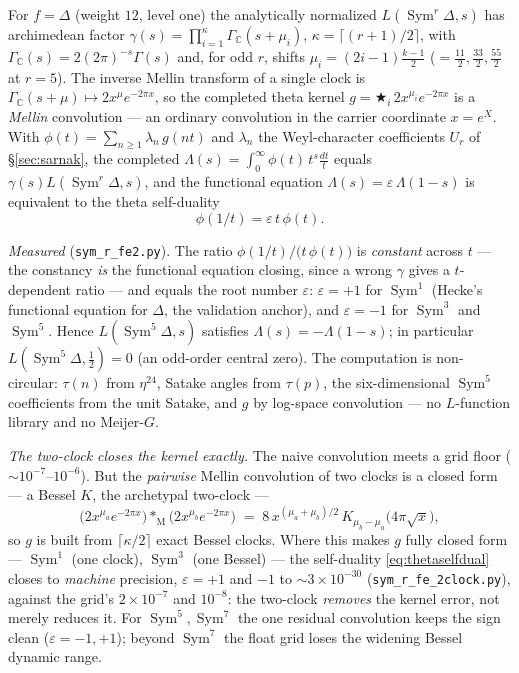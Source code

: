 \documentclass[11pt]{article}
\theoremstyle{definition}
\newcommand{\Sym}{\operatorname{Sym}}
\begin{document}
For $f=\Delta$ (weight $12$, level one) the analytically normalized $L(\Sym^r\Delta,s)$ has archimedean
factor $\gamma(s)=\prod_{i=1}^{\kappa}\Gamma_{\mathbb C}(s+\mu_i)$, $\kappa=\lceil (r{+}1)/2\rceil$, with
$\Gamma_{\mathbb C}(s)=2(2\pi)^{-s}\Gamma(s)$ and, for odd $r$, shifts $\mu_i=(2i{-}1)\tfrac{k-1}{2}$
($=\tfrac{11}2,\tfrac{33}2,\tfrac{55}2$ at $r=5$). The inverse Mellin transform of a single clock is
$\Gamma_{\mathbb C}(s+\mu)\!\mapsto\! 2x^{\mu}e^{-2\pi x}$, so the completed theta kernel
$g=\bigstar_{i}\,2x^{\mu_i}e^{-2\pi x}$ is a \emph{Mellin} convolution --- an ordinary convolution in the
carrier coordinate $x=e^{X}$. With $\phi(t)=\sum_{n\ge1}\lambda_n\,g(nt)$ and $\lambda_n$ the
Weyl-character coefficients $U_r$ of \S\ref{sec:sarnak}, the completed $\Lambda(s)=\int_0^\infty\phi(t)\,
t^{s}\tfrac{dt}{t}$ equals $\gamma(s)L(\Sym^r\Delta,s)$, and the functional equation
$\Lambda(s)=\varepsilon\,\Lambda(1-s)$ is equivalent to the theta self-duality
\begin{equation}\label{eq:thetaselfdual}
  \phi(1/t)=\varepsilon\,t\,\phi(t).
\end{equation}

\emph{Measured} (\texttt{sym\_r\_fe2.py}). The ratio $\phi(1/t)/\bigl(t\,\phi(t)\bigr)$ is \emph{constant}
across $t$ --- the constancy \emph{is} the functional equation closing, since a wrong $\gamma$ gives a
$t$-dependent ratio --- and equals the root number $\varepsilon$: $\varepsilon=+1$ for $\Sym^1$ (Hecke's
functional equation for $\Delta$, the validation anchor), and $\varepsilon=-1$ for $\Sym^3$ and $\Sym^5$.
Hence $L(\Sym^5\Delta,s)$ satisfies $\Lambda(s)=-\Lambda(1-s)$; in particular $L(\Sym^5\Delta,\tfrac12)=0$
(an odd-order central zero). The computation is non-circular: $\tau(n)$ from $\eta^{24}$, Satake angles
from $\tau(p)$, the six-dimensional $\Sym^5$ coefficients from the unit Satake, and $g$ by log-space
convolution --- no $L$-function library and no Meijer-$G$.

\emph{The two-clock closes the kernel exactly.} The naive convolution meets a grid floor
($\sim10^{-7}$--$10^{-6}$). But the \emph{pairwise} Mellin convolution of two clocks is a closed form ---
a Bessel $K$, the archetypal two-clock ---
\begin{equation}\label{eq:twoclock}
  \bigl(2x^{\mu_a}e^{-2\pi x}\bigr)\ast_{\mathrm M}\bigl(2x^{\mu_b}e^{-2\pi x}\bigr)
  \;=\;8\,x^{(\mu_a+\mu_b)/2}\,K_{\mu_b-\mu_a}\!\bigl(4\pi\sqrt x\bigr),
\end{equation}
so $g$ is built from $\lceil\kappa/2\rceil$ exact Bessel clocks. Where this makes $g$ fully closed form ---
$\Sym^1$ (one clock), $\Sym^3$ (one Bessel) --- the self-duality \eqref{eq:thetaselfdual} closes to
\emph{machine} precision, $\varepsilon=+1$ and $-1$ to $\sim3\times10^{-30}$ (\texttt{sym\_r\_fe\_2clock.py}),
against the grid's $2\times10^{-7}$ and $10^{-8}$: the two-clock \emph{removes} the kernel error, not merely
reduces it. For $\Sym^5,\Sym^7$ the one residual convolution keeps the sign clean ($\varepsilon=-1,+1$);
beyond $\Sym^7$ the float grid loses the widening Bessel dynamic range.
\end{document}
